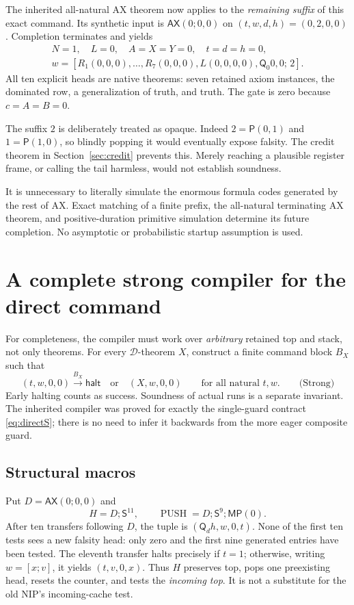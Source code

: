 \documentclass[11pt]{article}
\newcommand{\pair}{\mathsf P}
\newcommand{\quant}{\mathsf Q}
\newcommand{\AX}{\mathsf{AX}}
\newcommand{\MP}{\mathsf{MP}}
\newcommand{\Tr}{\mathsf S}
\newcommand{\calD}{\mathcal D}
\begin{document}
The inherited all-natural AX theorem now applies to the
\emph{remaining suffix} of this exact command. Its synthetic input
is $\AX(0;0,0)$ on $(t,w,d,h)=(0,2,0,0)$. Completion terminates
and yields
\[
\begin{gathered}
 N=1,\quad L=0,\quad A=X=Y=0,\quad t=d=h=0,\\
 w=[R_1(0,0,0),\ldots,R_7(0,0,0),
       L(0,0,0,0),\quant_0 0,0;\,2].
\end{gathered}
\]
All ten explicit heads are native theorems: seven retained axiom
instances, the dominated row, a generalization of truth, and truth.
The gate is zero because $c=A=B=0$.

The suffix $2$ is deliberately treated as opaque. Indeed
$2=\pair(0,1)$ and $1=\pair(1,0)$, so blindly popping it would
eventually expose falsity. The credit theorem in
Section~\ref{sec:credit} prevents this. Merely reaching a
plausible register frame, or calling the tail harmless, would not
establish soundness.

It is unnecessary to literally simulate the enormous formula codes
generated by the rest of AX. Exact matching of a finite prefix,
the all-natural terminating AX theorem, and positive-duration
primitive simulation determine its future completion. No
asymptotic or probabilistic startup assumption is used.

\section{A complete strong compiler for the direct command}
\label{sec:compiler}

For completeness, the compiler must work over \emph{arbitrary}
retained top and stack, not only theorems. For every
$\calD$-theorem $X$, construct a finite command block $B_X$ such that
\[
 (t,w,0,0)\xrightarrow{B_X}\mathsf{halt}
 \quad\text{or}\quad (X,w,0,0)
 \qquad\text{for all natural }t,w.
 \qquad\text{(Strong)}
\]
Early halting counts as success. Soundness of actual runs is a
separate invariant. The inherited compiler \cite{transfer} was
proved for exactly the single-guard contract \eqref{eq:directS};
there is no need to infer it backwards from the more eager
composite guard.

\subsection{Structural macros}

Put $D=\AX(0;0,0)$ and
\[
 H=D;\Tr^{11},\qquad
 \operatorname{PUSH}=D;\Tr^9;\MP(0).
\]
After ten transfers following $D$, the tuple is
$(\quant_d h,w,0,t)$. None of the first ten tests sees a new
falsity head: only zero and the first nine generated entries have
been tested. The eleventh transfer halts precisely if $t=1$;
otherwise, writing $w=[x;v]$, it yields $(t,v,0,x)$.
Thus $H$ preserves top, pops one preexisting head, resets the
counter, and tests the \emph{incoming top}. It is not a substitute
for the old NIP's incoming-cache test.
\end{document}
